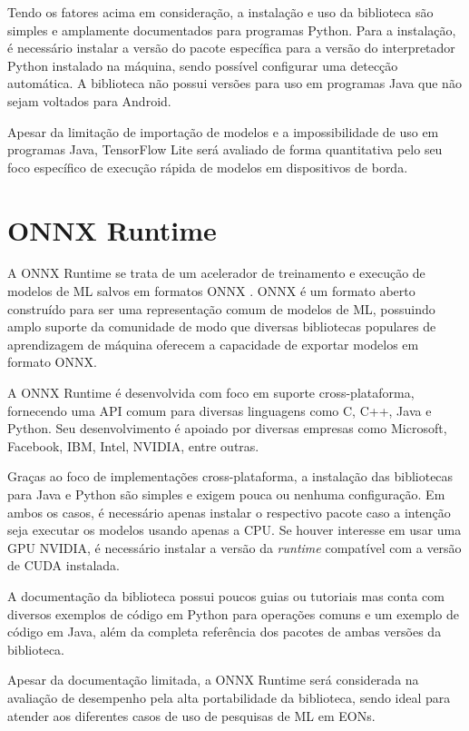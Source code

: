 Tendo os fatores acima em consideração, a instalação e uso da biblioteca são simples e amplamente documentados para programas Python. Para a instalação, é necessário instalar a versão do pacote específica para a versão do interpretador Python instalado na máquina, sendo possível configurar uma detecção automática. A biblioteca não possui versões para uso em programas Java que não sejam voltados para Android.

Apesar da limitação de importação de modelos e a impossibilidade de uso em programas Java, TensorFlow Lite será avaliado de forma quantitativa pelo seu foco específico de execução rápida de modelos em dispositivos de borda.

\section{ONNX Runtime}

A ONNX Runtime \cite{ml_site_onnx_runtime} se trata de um acelerador de treinamento e execução de modelos de ML salvos em formatos ONNX \cite{ml_site_onnx}. \acrfull{ONNX} é um formato aberto construído para ser uma representação comum de modelos de ML, possuindo amplo suporte da comunidade de modo que diversas bibliotecas populares de aprendizagem de máquina oferecem a capacidade de exportar modelos em formato ONNX.

A ONNX Runtime é desenvolvida com foco em suporte cross-plataforma, fornecendo uma \acrshort{API} comum para diversas linguagens como C, C++, Java e Python. Seu desenvolvimento é apoiado por diversas empresas como Microsoft, Facebook, IBM, Intel, NVIDIA, entre outras.

Graças ao foco de implementações cross-plataforma, a instalação das bibliotecas para Java e Python são simples e exigem pouca ou nenhuma configuração. Em ambos os casos, é necessário apenas instalar o respectivo pacote caso a intenção seja executar os modelos usando apenas a CPU. Se houver interesse em usar uma GPU NVIDIA, é necessário instalar a versão da \textit{runtime} compatível com a versão de \acrshort{CUDA} instalada.

A documentação da biblioteca possui poucos guias ou tutoriais mas conta com diversos exemplos de código em Python para operações comuns e um exemplo de código em Java, além da completa referência dos pacotes de ambas versões da biblioteca.

Apesar da documentação limitada, a ONNX Runtime será considerada na avaliação de desempenho pela alta portabilidade da biblioteca, sendo ideal para atender aos diferentes casos de uso de pesquisas de ML em EONs.

